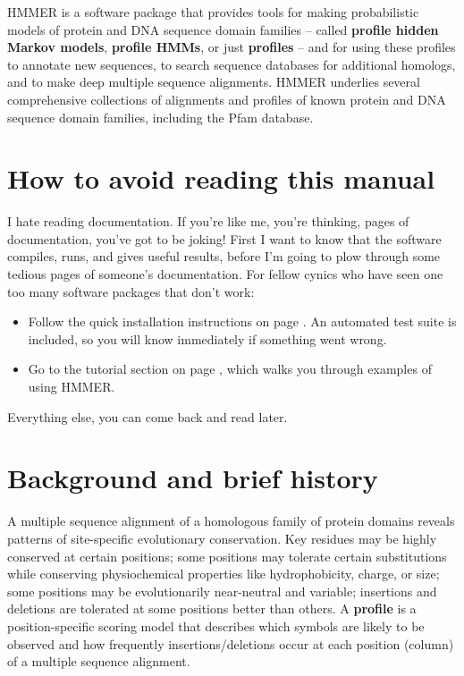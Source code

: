 HMMER is a software package that provides tools for making
probabilistic models of protein and DNA sequence domain families --
called \textbf{profile hidden Markov models}, \textbf{profile HMMs},
or just \textbf{profiles} -- and for using these profiles to annotate
new sequences, to search sequence databases for additional homologs,
and to make deep multiple sequence alignments.  HMMER underlies
several comprehensive collections of alignments and profiles of known
protein and DNA sequence domain families, including the Pfam
database.


\section{How to avoid reading this manual}

I hate reading documentation. If you're like me, you're thinking,
\pageref*{manualend} pages of documentation, you've got to be joking!
First I want to know that the software compiles, runs, and gives
useful results, before I'm going to plow through some
\pageref*{manualend} tedious pages of someone's documentation. For
fellow cynics who have seen one too many software packages that don't
work:

\begin{itemize}

\item Follow the quick installation instructions on page
  \pageref{chapter:installation}. An automated test suite is included,
  so you will know immediately if something went
  wrong.

\item Go to the tutorial section on page \pageref{chapter:tutorial},
  which walks you through examples of using HMMER.

\end{itemize}

Everything else, you can come back and read later.



\section{Background and brief history}

A multiple sequence alignment of a homologous family of protein
domains reveals patterns of site-specific evolutionary
conservation. Key residues may be highly conserved at certain
positions; some positions may tolerate certain substitutions while
conserving physiochemical properties like hydrophobicity, charge, or
size; some positions may be evolutionarily near-neutral and variable;
insertions and deletions are tolerated at some positions better than
others.  A \textbf{profile} is a position-specific scoring model that
describes which symbols are likely to be observed and how frequently
insertions/deletions occur at each position (column) of a
multiple sequence alignment.

